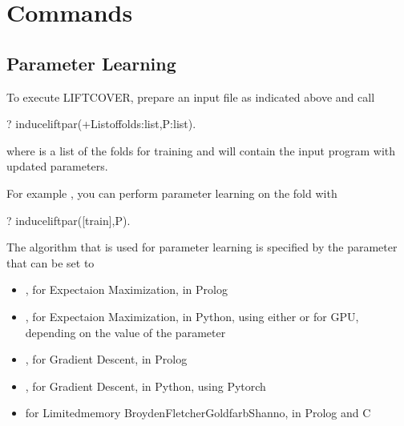 \documentclass[letterpaper,10pt,english]{sphinxmanual}
\begin{document}
\section{Commands}
\label{\detokenize{index:commands}}

\subsection{Parameter Learning}
\label{\detokenize{index:parameter-learning}}
\sphinxAtStartPar
To execute LIFTCOVER, prepare an input file as indicated above and call

\begin{sphinxVerbatim}[commandchars=\\\{\}]
?\PYGZhy{} induce\PYGZus{}lift\PYGZus{}par(+List\PYGZus{}of\PYGZus{}folds:list,\PYGZhy{}P:list).
\end{sphinxVerbatim}

\sphinxAtStartPar
where  is a list of the folds for training and  will contain
the input program with updated parameters.

\sphinxAtStartPar
For example , you can perform parameter learning on the  fold with

\begin{sphinxVerbatim}[commandchars=\\\{\}]
?\PYGZhy{} induce\PYGZus{}lift\PYGZus{}par([train],P).
\end{sphinxVerbatim}

\sphinxAtStartPar
The algorithm that is used for parameter learning is specified by
the parameter  that can be set to
\begin{itemize}
\item {} 
\sphinxAtStartPar
{}, for Expectaion Maximization, in Prolog

\item {} 
\sphinxAtStartPar
{}, for Expectaion Maximization, in Python, using either  or  for GPU, depending on the value of the parameter 

\item {} 
\sphinxAtStartPar
{}, for Gradient Descent, in Prolog

\item {} 
\sphinxAtStartPar
{}, for Gradient Descent, in Python, using Pytorch

\item {} 
\sphinxAtStartPar
{} for Limited\sphinxhyphen{}memory Broyden\sphinxhyphen{}Fletcher\sphinxhyphen{}Goldfarb\sphinxhyphen{}Shanno, in Prolog and C

\end{itemize}
\end{document}
